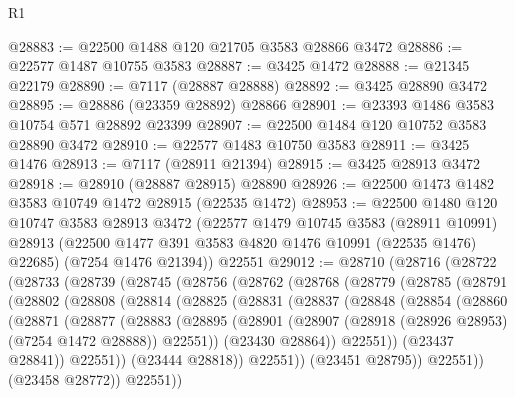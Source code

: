\begin{lexlean}{R1}
\begin{coremodule}
@28883 := @22500 @1488 @120 @21705 @3583 @28866 @3472
@28886 := @22577 @1487 @10755 @3583
@28887 := @3425 @1472
@28888 := @21345 @22179
@28890 := @7117 (@28887 @28888)
@28892 := @3425 @28890 @3472
@28895 := @28886 (@23359 @28892) @28866
@28901 := @23393 @1486 @3583 @10754 @571 @28892 @23399
@28907 := @22500 @1484 @120 @10752 @3583 @28890 @3472
@28910 := @22577 @1483 @10750 @3583
@28911 := @3425 @1476
@28913 := @7117 (@28911 @21394)
@28915 := @3425 @28913 @3472
@28918 := @28910 (@28887 @28915) @28890
@28926 := @22500 @1473 @1482 @3583 @10749 @1472 @28915 (@22535 @1472)
@28953 := @22500
    @1480
    @120
    @10747
    @3583
    @28913
    @3472
    (@22577
      @1479
      @10745
      @3583
      (@28911 @10991)
      @28913
      (@22500 @1477 @391 @3583 @4820 @1476 @10991 (@22535 @1476) @22685)
      (@7254 @1476 @21394))
    @22551
@29012 := @28710
    (@28716
      (@28722
        (@28733
          (@28739
            (@28745
              (@28756
                (@28762
                  (@28768
                    (@28779
                      (@28785
                        (@28791
                          (@28802
                            (@28808
                              (@28814
                                (@28825
                                  (@28831
                                    (@28837
                                      (@28848
                                        (@28854
                                          (@28860
                                            (@28871
                                              (@28877
                                                (@28883
                                                  (@28895
                                                    (@28901
                                                      (@28907
                                                        (@28918
                                                          (@28926 @28953)
                                                          (@7254 @1472 @28888))
                                                        @22551))
                                                    (@23430 @28864))
                                                  @22551))
                                              (@23437 @28841))
                                            @22551))
                                        (@23444 @28818))
                                      @22551))
                                  (@23451 @28795))
                                @22551))
                            (@23458 @28772))
                          @22551))

\end{coremodule}
\end{lexlean}
